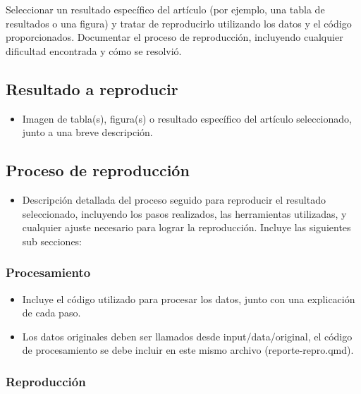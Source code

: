 \documentclass[
  spanish,
  13pt,
  letterpaper,
  DIV=11,
  numbers=noendperiod]{scrartcl}
\providecommand{\tightlist}{%
  \setlength{\itemsep}{0pt}\setlength{\parskip}{0pt}}
\begin{document}
Seleccionar un resultado específico del artículo (por ejemplo, una tabla
de resultados o una figura) y tratar de reproducirlo utilizando los
datos y el código proporcionados. Documentar el proceso de reproducción,
incluyendo cualquier dificultad encontrada y cómo se resolvió.

\subsection{Resultado a reproducir}\label{resultado-a-reproducir}

\begin{itemize}
\tightlist
\item
  Imagen de tabla(s), figura(s) o resultado específico del artículo
  seleccionado, junto a una breve descripción.
\end{itemize}

\subsection{Proceso de reproducción}\label{proceso-de-reproducciuxf3n}

\begin{itemize}
\tightlist
\item
  Descripción detallada del proceso seguido para reproducir el resultado
  seleccionado, incluyendo los pasos realizados, las herramientas
  utilizadas, y cualquier ajuste necesario para lograr la reproducción.
  Incluye las siguientes sub secciones:
\end{itemize}

\subsubsection{Procesamiento}\label{procesamiento}

\begin{itemize}
\item
  Incluye el código utilizado para procesar los datos, junto con una
  explicación de cada paso.
\item
  Los datos originales deben ser llamados desde input/data/original, el
  código de procesamiento se debe incluir en este mismo archivo
  (reporte-repro.qmd).
\end{itemize}

\subsubsection{Reproducción}\label{reproducciuxf3n}
\end{document}
